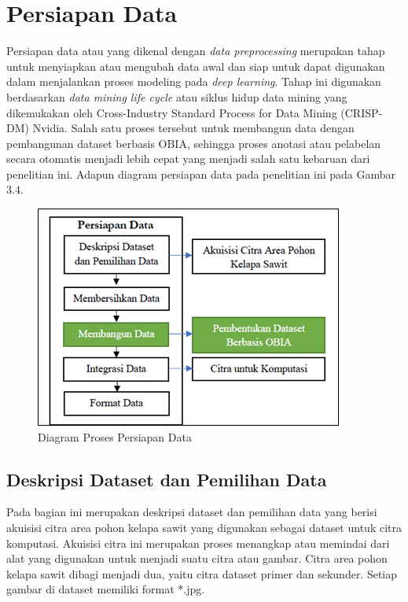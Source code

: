 \section{Persiapan Data}
\hspace{1,2cm}Persiapan data atau yang dikenal dengan \textit{data preprocessing} merupakan tahap untuk menyiapkan atau mengubah data awal dan siap untuk dapat digunakan dalam menjalankan proses modeling pada \textit{deep learning}. Tahap ini digunakan berdasarkan \textit{data mining life cycle} atau siklus hidup data mining yang dikemukakan oleh Cross-Industry Standard Process for Data Mining (CRISP-DM) Nvidia. Salah satu proses tersebut untuk membangun data dengan pembangunan dataset berbasis OBIA, sehingga proses anotasi atau pelabelan secara otomatis menjadi lebih cepat yang menjadi salah satu kebaruan dari penelitian ini. Adapun diagram persiapan data pada penelitian ini pada Gambar 3.4.

\begin{figure}[H]
	\vspace{-0.1cm}
	\begin{center}
		\includegraphics[width=0.6\columnwidth]{bab3/Gambar/Picture4.png}
	\end{center}
	\vspace{-0.2cm}
	\captionsetup{justification=centering}
	\caption{Diagram Proses Persiapan Data}\label{img:Diagram-Proses-Persiapan-Data}
\end{figure}

\subsection{Deskripsi Dataset dan Pemilihan Data}
\label{sec:Deskripsi-Dataset-dan-Pemilihan-Data}
\hspace{1,2cm}Pada bagian ini merupakan deskripsi dataset dan pemilihan data yang berisi akuisisi citra area pohon kelapa sawit yang digunakan sebagai dataset untuk citra komputasi. Akuisisi citra ini merupakan proses menangkap atau memindai dari alat yang digunakan untuk menjadi suatu citra atau gambar. Citra area pohon kelapa sawit dibagi menjadi dua, yaitu citra dataset primer dan sekunder. Setiap gambar di dataset memiliki format *.jpg.

